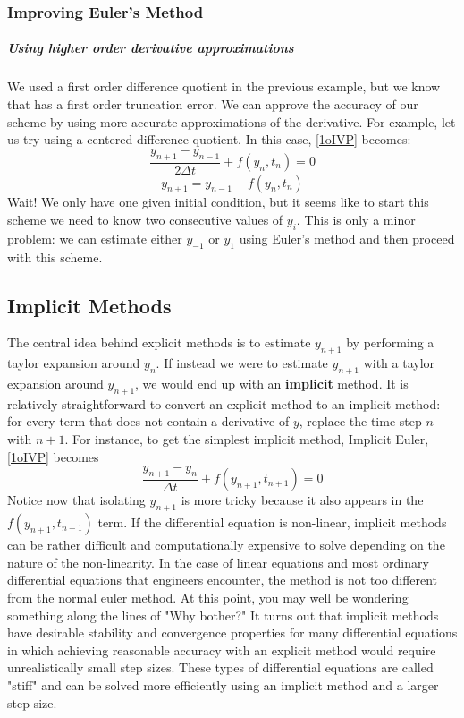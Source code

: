 \documentclass[]{article}
\theoremstyle{definition}
\numberwithin{equation}{section}
\begin{document}
	\subsubsection{Improving Euler's Method}
	\subparagraph{Using higher order derivative approximations}
	We used a first order difference quotient in the previous example, but we know that has a first order truncation error. We can approve the accuracy of our scheme by using more accurate approximations of the derivative. For example, let us try using a centered difference quotient. In this case, \eqref{1oIVP} becomes:
	\begin{equation}
		\frac{y_{n+1} - y_{n-1}}{2\Delta t} + f(y_n,t_n) = 0
	\end{equation}
	\begin{equation}
		y_{n+1} = y_{n-1} - f(y_n,t_n)
	\end{equation}
	Wait! We only have one given initial condition, but it seems like to start this scheme we need to know two consecutive values of $y_i$. This is only a minor problem: we can estimate either $y_{-1}$ or $y_{1}$ using Euler's method and then proceed with this scheme.
	\subsection{Implicit Methods}
	The central idea behind explicit methods is to estimate $y_{n+1}$ by performing a taylor expansion around $y_n$. If instead we were to estimate $y_{n+1}$ with a taylor expansion around $y_{n+1}$, we would end up with an \textbf{implicit} method. It is relatively straightforward to convert an explicit method to an implicit method: for every term that does not contain a derivative of $y$, replace the time step $n$ with $n+1$. For instance, to get the simplest implicit method, Implicit Euler,  \ref{1oIVP} becomes
	\begin{equation}
		\frac{y_{n+1} - y_n}{\Delta t} + f(y_{n+1},t_{n+1}) = 0
	\end{equation}
	Notice now that isolating $y_{n+1}$ is more tricky because it also appears in the $f(y_{n+1},t_{n+1})$ term. If the differential equation is non-linear, implicit methods can be rather difficult and computationally expensive to solve depending on the nature of the non-linearity. In the case of linear equations and most ordinary differential equations that engineers encounter, the method is not too different from the normal euler method. At this point, you may well be wondering something along the lines of "Why bother?" It turns out that implicit methods have desirable stability and convergence properties for many differential equations in which achieving reasonable accuracy with an explicit method would require unrealistically small step sizes. These types of differential equations are called "stiff" and can be solved more efficiently using an implicit method and a larger step size.
	
\end{document}
